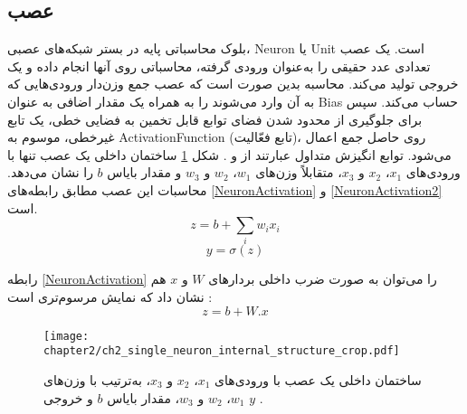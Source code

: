  
 
 \subsection{عصب}
 بلوک محاسباتی پایه در بستر شبکه‌های عصبی، \gls{Neuron} یا \gls{Unit} است. یک عصب تعدادی عدد حقیقی را به‌عنوان ورودی گرفته، محاسباتی روی آنها انجام داده و یک خروجی تولید می‌کند. محاسبه بدین صورت است که عصب جمع وزن‌دار ورودی‌هایی که به آن وارد می‌شوند را به همراه یک مقدار اضافی به عنوان \gls{Bias} حساب می‌کند. سپس برای جلوگیری از محدود شدن فضای توابع قابل تخمین به فضایی خطی، یک تابع غیرخطی، موسوم به \gls{ActivationFunction} (تابع فعّالیت)، روی حاصل جمع اعمال می‌شود. توابع انگیزش متداول عبارتند از  و . شکل \ref{ch2_single_neuron_internal_structure_crop.pdf} ساختمان داخلی یک عصب تنها با ورودی‌های $x_1 $، $ x_2 $ و $ x_3 $، متقابلاً وزن‌های $ w_1 $، $ w_2 $ و $ w_3 $ و مقدار بایاس $ b $ را نشان می‌دهد. محاسبات این عصب مطابق رابطه‌های \ref{NeuronActivation} و \ref{NeuronActivation2} است.
 \begin{equation}\label{NeuronActivation}
 z = b+ \sum_iw_ix_i 
 \end{equation}
 \begin{equation}\label{NeuronActivation2}
 y = \sigma(z)
 \end{equation}
 
 
 رابطه \ref{NeuronActivation} را می‌توان به صورت ضرب داخلی بردارهای $ W $ و $ x $ هم نشان داد که نمایش مرسوم‌تری است \cite{Jurafsky2017}:
  \begin{equation}\label{NeuronActivation3}
 z = b+ W.x
 \end{equation} 
 
 
 \begin{figure}%
 	\centering
 	\texttt{[image: chapter2/ch2\_single\_neuron\_internal\_structure\_crop.pdf]}
 	\caption[ساختمان داخلی یک عصب]
 	{
 		ساختمان داخلی یک عصب با ورودی‌های $x_1 $، $ x_2 $ و $ x_3 $، به‌ترتیب با وزن‌های $ w_1 $، $ w_2 $ و $ w_3 $، مقدار بایاس $ b $ و خروجی $y$ \cite{Jurafsky2017}.
 	}
 	\label{ch2_single_neuron_internal_structure_crop.pdf}
 \end{figure}
 
 
 
